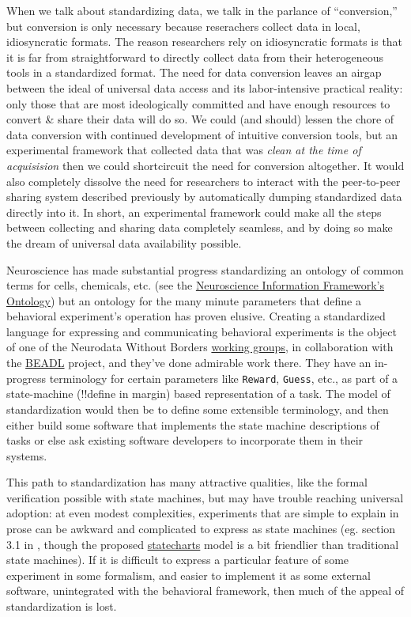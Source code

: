 \documentclass[10pt]{article}
\begin{document}
\begin{multicols}{2}
When we talk about standardizing data, we talk in the parlance of
``conversion,'' but conversion is only necessary because reserachers
collect data in local, idiosyncratic formats. The reason researchers
rely on idiosyncratic formats is that it is far from straightforward to
directly collect data from their heterogeneous tools in a standardized
format. The need for data conversion leaves an airgap between the ideal
of universal data access and its labor-intensive practical reality: only
those that are most ideologically committed and have enough resources to
convert \& share their data will do so. We could (and should) lessen the
chore of data conversion with continued development of intuitive
conversion tools, but an experimental framework that collected data that
was \emph{clean at the time of acquisision} then we could shortcircuit
the need for conversion altogether. It would also completely dissolve
the need for researchers to interact with the peer-to-peer sharing
system described previously by automatically dumping standardized data
directly into it. In short, an experimental framework could make all the
steps between collecting and sharing data completely seamless, and by
doing so make the dream of universal data availability possible.

Neuroscience has made substantial progress standardizing an ontology of
common terms for cells, chemicals, etc. (see the
\href{https://github.com/SciCrunch/NIF-Ontology}{Neuroscience
Information Framework's Ontology}) but an ontology for the many minute
parameters that define a behavioral experiment's operation has proven
elusive. Creating a standardized language for expressing and
communicating behavioral experiments is the object of one of the
Neurodata Without Borders
\href{https://archive.org/details/nwb-behavioral-task-wg}{working
groups}, in collaboration with the
\href{https://archive.org/details/beadl-xml-documentation-v-0.1}{BEADL}
project, and they've done admirable work there. They have an in-progress
terminology for certain parameters like \texttt{Reward}, \texttt{Guess},
etc., as part of a state-machine (!!define in margin) based
representation of a task. The model of standardization would then be to
define some extensible terminology, and then either build some software
that implements the state machine descriptions of tasks or else ask
existing software developers to incorporate them in their systems.

This path to standardization has many attractive qualities, like the
formal verification possible with state machines, but may have trouble
reaching universal adoption: at even modest complexities, experiments
that are simple to explain in prose can be awkward and complicated to
express as state machines (eg. section 3.1 in \cite{saundersAutopilotAutomatingBehavioral2019} , though the proposed
\href{https://statecharts.github.io/}{statecharts} model is a bit
friendlier than traditional state machines). If it is difficult to
express a particular feature of some experiment in some formalism, and
easier to implement it as some external software, unintegrated with the
behavioral framework, then much of the appeal of standardization is
lost.


\end{multicols}
\end{document}
